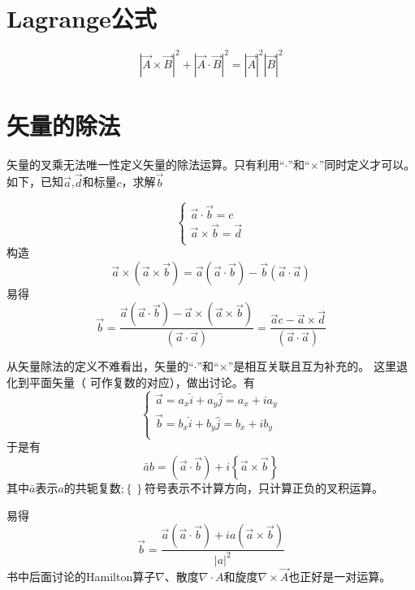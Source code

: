 \section{Lagrange公式}
\[
\left| \vec{A}\times \vec{B} \right|^2+\left| \vec{A}\cdot \vec{B} \right|^2=\left| \vec{A} \right|^2\left| \vec{B} \right|^2
\]


\section{矢量的除法}
 矢量的叉乘无法唯一性定义矢量的除法运算。只有利用“$\cdot$”和“$\times$”同时定义才可以。如下，已知$\vec{a}$,$\vec{d}$和标量$c$，求解$\vec{b}$

\begin{equation*}
\left\{ \begin{array}{c}
\vec{a}\cdot \vec{b}=c\\
\vec{a}\times \vec{b}=\vec{d}\\
\end{array} \right. 
\end{equation*}
构造
\[
\vec{a}\times \left( \vec{a}\times \vec{b} \right) =\vec{a}\left( \vec{a}\cdot \vec{b} \right) -\vec{b}\left( \vec{a}\cdot \vec{a} \right) 
\]
易得
\[
\vec{b}=\frac{\vec{a}\left( \vec{a}\cdot \vec{b} \right) -\vec{a}\times \left( \vec{a}\times \vec{b} \right)}{\left( \vec{a}\cdot \vec{a} \right)}=\frac{\vec{a}c-\vec{a}\times \vec{d}}{\left( \vec{a}\cdot \vec{a} \right)}
\]


从矢量除法的定义不难看出，矢量的“$\cdot$”和“$\times$”是相互关联且互为补充的。
这里退化到平面矢量（ 可作复数的对应），做出讨论。有
\[
\left\{ \begin{array}{c}
\vec{a}=a_x\hat{i}+a_y\hat{j}=a_x+ia_y\\
\vec{b}=b_x\hat{i}+b_y\hat{j}=b_x+ib_y\\
\end{array} \right. 
\]
于是有
\[
\bar{a}b=\left( \vec{a}\cdot \vec{b} \right) +\mathit{i}\left\{ \vec{a}\times \vec{b} \right\} 
\]
其中$\bar{a}$表示$a$的共轭复数;$\left\{\right\}$符号表示不计算方向，只计算正负的叉积运算。

\noindent 易得
\[
\vec{b}=\frac{\vec{a}\left( \vec{a}\cdot \vec{b} \right) +\mathit{i}a\left( \vec{a}\times \vec{b} \right)}{\left| \mathit{a} \right|^2}
\]
书中后面讨论的Hamilton算子$\nabla $、散度$\nabla\cdot A$和旋度$\nabla\times\vec{A}$也正好是一对运算。
